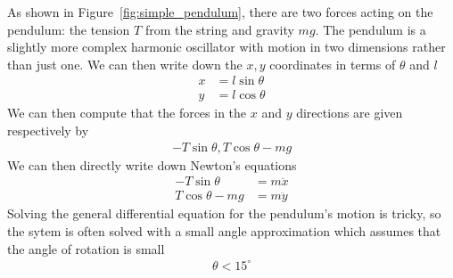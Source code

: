 \documentclass[book.tex]{subfiles}
\begin{document}
As shown in Figure~\ref{fig:simple_pendulum}, there are two forces acting on the pendulum: the tension $T$ from the string and gravity $mg$. The pendulum is a slightly more complex harmonic oscillator with motion in two dimensions rather than just one. We can then write down the $x,y$ coordinates in terms of $\theta$ and $l$
\begin{align}
    x &= l \sin \theta \\
    y &= l \cos \theta
\end{align}
We can then compute that the forces in the $x$ and $y$ directions are given respectively by
\begin{align}
    -T \sin \theta, T\cos \theta - mg
\end{align}
We can then directly write down Newton's equations
\begin{align}
    -T \sin \theta &= m \ddot{x}  \\
    T \cos \theta - mg &= m \ddot{y}
\end{align}
Solving the general differential equation for the pendulum's motion is tricky, so the sytem is often solved with a small angle approximation which assumes that the angle of rotation is small
\begin{align}
    \theta < 15^\circ
\end{align}
\end{document}
